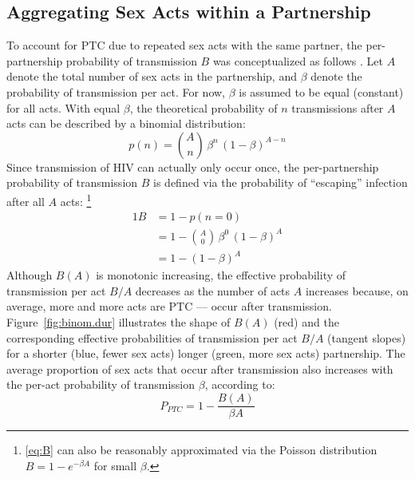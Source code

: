 \subsection{Aggregating Sex Acts within a Partnership}\label{foi.prior.bhom}
To account for PTC due to repeated sex acts with the same partner,
the per-partnership probability of transmission $B$ was conceptualized as follows \cite{Allard1990}.
Let $A$ denote the total number of sex acts in the partnership,
and $\beta$ denote the probability of transmission per act.
For now, $\beta$ is assumed to be equal (constant) for all acts.
With equal $\beta$, the theoretical probability of $n$ transmissions after $A$ acts
can be described by a binomial distribution:
\begin{equation}\label{eq:B.n}
  p(n) = {A \choose n}\,\beta^n\,{(1 - \beta)}^{A-n}
\end{equation}
Since transmission of HIV can actually only occur once,
the per-partnership probability of transmission $B$ is defined via
the probability of ``escaping'' infection after all $A$ acts:%
\footnote{\eqref{eq:B} can also be reasonably approximated
  via the Poisson distribution $B = 1 - e^{-\beta A}$ for small $\beta$.}
\begin{alignat}{1}\label{eq:B}
  B &= 1 - p(n = 0) \nonumber\\
  &= 1 - {A \choose 0}\,\beta^0\,{(1 - \beta)}^{A} \nonumber\\
  &= 1 - {(1 - \beta)}^A
\end{alignat}
Although $B(A)$ is monotonic increasing,
the effective probability of transmission per act $B/A$
decreases as the number of acts $A$ increases because,
on average, more and more acts are PTC --- \ie occur after transmission.
Figure~\ref{fig:binom.dur} illustrates the shape of $B(A)$ (red)
and the corresponding effective probabilities of transmission per act $B/A$ (tangent slopes)
for a shorter (blue, fewer sex acts) \vs longer (green, more sex acts) partnership.
The average proportion of sex acts that occur after transmission
also increases with the per-act probability of transmission $\beta$, according to:
\begin{equation}\label{eq:ptc}
  P_{PTC} = 1 - \frac{B(A)}{\beta A}
\end{equation}
